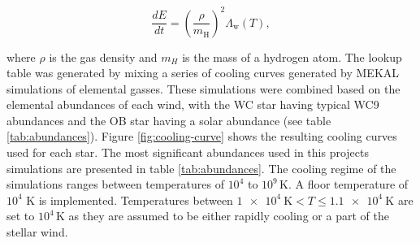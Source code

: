\documentclass[fleqn,usenatbib]{mnras}
\begin{document}
\begin{equation}
  \frac{dE}{dt} = \left(\frac{\rho}{m_\text{H}}\right)^2 \Lambda_\text{w} (T),
\end{equation}

\noindent
where $\rho$ is the gas density and $m_H$ is the mass of a hydrogen atom.
The lookup table was generated by mixing a series of cooling curves generated by MEKAL simulations of elemental gasses.
These simulations were combined based on the elemental abundances of each wind, with the WC star having typical WC9 abundances and the OB star having a solar abundance (see table \ref{tab:abundances}).
%
%
Figure \ref{fig:cooling-curve} shows the resulting cooling curves used for each star.
The most significant abundances used in this projects simulations are presented in table \ref{tab:abundances}.
The cooling regime of the simulations ranges between temperatures of $10^4$ to $10^9\,\si{\kelvin}$.
A floor temperature of $10^4$ \si{\kelvin} is implemented.
Temperatures between $\SI{1e4}{\kelvin} < T \leq \SI{1.1e4}{\kelvin}$ are set to $10^4\,\si{\kelvin}$ as they are assumed to be either rapidly cooling or a part of the stellar wind.
\end{document}
